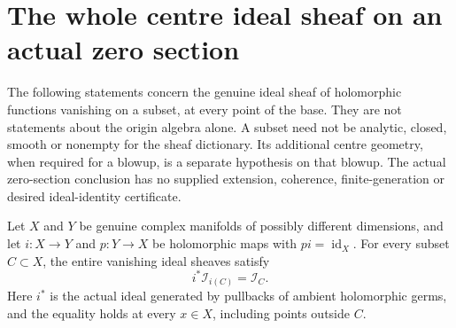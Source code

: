 \section{The whole centre ideal sheaf on an actual zero section}

The following statements concern the genuine ideal sheaf of holomorphic
functions vanishing on a subset, at every point of the base. They are not
statements about the origin algebra alone. A subset need not be analytic,
closed, smooth or nonempty for the sheaf dictionary. Its additional centre
geometry, when required for a blowup, is a separate hypothesis on that
blowup. The actual zero-section conclusion has no supplied extension,
coherence, finite-generation or desired ideal-identity certificate.

\begin{theorem}
\label{hir:whole-holomorphic-retraction-centre-sheaf}
\leanok
Let $X$ and $Y$ be genuine complex manifolds of possibly different
dimensions, and let $i:X\to Y$ and $p:Y\to X$ be holomorphic maps with
$pi=\operatorname{id}_X$. For every subset $C\subset X$, the entire
vanishing ideal sheaves satisfy
\[
 i^*\mathcal I_{i(C)}=\mathcal I_C.
\]
Here $i^*$ is the actual ideal generated by pullbacks of ambient
holomorphic germs, and the equality holds at every $x\in X$, including
points outside $C$.
\end{theorem}
